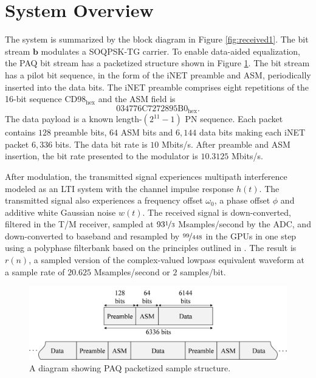 \section{System Overview}
The system is summarized by the block diagram in Figure \ref{fig:received1}.
The bit stream $\mathbf{b}$ modulates a SOQPSK-TG carrier.
To enable data-aided equalization, the PAQ bit stream has a packetized structure shown in Figure \ref{fig:packetStructure_intro}.
The bit stream has a pilot bit sequence, in the form of the iNET preamble and ASM, periodically inserted into the data bits.
The iNET preamble comprises eight repetitions of the 16-bit sequence $\text{CD98}_\text{hex}$ and the ASM field is
\begin{equation}
\text{034776C7272895B0}_\text{hex}.
\end{equation}
The data payload is a known length-$(2^{11} - 1)$ PN sequence.
Each packet contains $128$ preamble bits, $64$ ASM bits and $6{,}144$ data bits making each iNET packet $6{,}336$ bits.
The data bit rate is $10$ Mbits/s. 
After preamble and ASM insertion, the bit rate presented to the modulator is $10.3125$ Mbits/s.

After modulation, the transmitted signal experiences multipath interference modeled as an LTI system with the channel impulse response $h(t)$.
The transmitted signal also experiences a frequency offset $\omega_0$, a phase offset $\phi$ and additive white Gaussian noise $w(t)$.
The received signal is down-converted, filtered in the T/M receiver, sampled at $93\nicefrac{1}{3}$ Msamples/second by the ADC, and down-converted to baseband and resampled by $\nicefrac{99}{448}$ in the GPUs in one step using a polyphase filterbank based on the principles outlined in \cite[chap. (9)]{rice:2009}.
The result is $r(n)$, a sampled version of the complex-valued lowpass equivalent waveform at a sample rate of $20.625$ Msamples/second or $2$ samples/bit.
\begin{figure}
	\centering\includegraphics[width=9.47in/100*55]{figures/intro/packetSturcture.pdf}
	\caption{A diagram showing PAQ packetized sample structure.}
	\label{fig:packetStructure_intro}
\end{figure}

